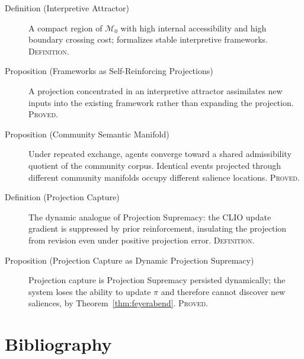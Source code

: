 \documentclass[12pt, a4paper, oneside]{book}
\newcommand{\M}{\mathcal{M}}
\newcommand{\proj}{\pi}
\begin{document}
\begin{description}
\item[Definition (Interpretive Attractor)] A compact region of $\M_0$
  with high internal accessibility and high boundary crossing cost;
  formalizes stable interpretive frameworks. \textsc{Definition.}

\item[Proposition (Frameworks as Self-Reinforcing Projections)]
  A projection concentrated in an interpretive attractor assimilates new
  inputs into the existing framework rather than expanding the projection.
  \textsc{Proved.}

\item[Proposition (Community Semantic Manifold)]
  Under repeated exchange, agents converge toward a shared admissibility
  quotient of the community corpus. Identical events projected through
  different community manifolds occupy different salience locations.
  \textsc{Proved.}

\item[Definition (Projection Capture)] The dynamic analogue of
  Projection Supremacy: the CLIO update gradient is suppressed by prior
  reinforcement, insulating the projection from revision even under
  positive projection error. \textsc{Definition.}

\item[Proposition (Projection Capture as Dynamic Projection Supremacy)]
  Projection capture is Projection Supremacy persisted dynamically; the
  system loses the ability to update $\proj$ and therefore cannot
  discover new saliences, by Theorem~\ref{thm:feyerabend}.
  \textsc{Proved.}
\end{description}

\chapter*{Bibliography}
\end{document}
